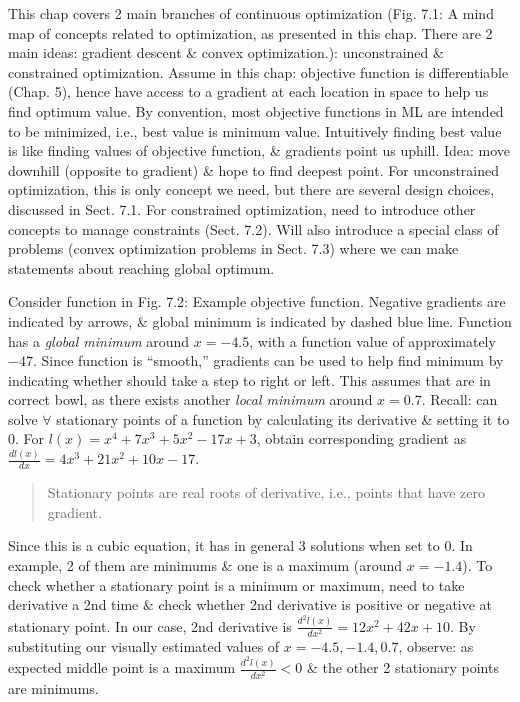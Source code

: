\documentclass{article}
\begin{document}
\begin{enumerate}
\begin{itemize}
\begin{quote}
		\end{quote}
		This chap covers 2 main branches of continuous optimization ({\sf Fig. 7.1: A mind map of concepts related to optimization, as presented in this chap. There are 2 main ideas: gradient descent \& convex optimization.}): unconstrained \& constrained optimization. Assume in this chap: objective function is differentiable (Chap. 5), hence have access to a gradient at each location in space to help us find optimum value. By convention, most objective functions in ML are intended to be minimized, i.e., best value is minimum value. Intuitively finding best value is like finding values of objective function, \& gradients point us uphill. Idea: move downhill (opposite to gradient) \& hope to find deepest point. For unconstrained optimization, this is only concept we need, but there are several design choices, discussed in Sect. 7.1. For constrained optimization, need to introduce other concepts to manage constraints (Sect. 7.2). Will also introduce a special class of problems (convex optimization problems in Sect. 7.3) where we can make statements about reaching global optimum.
		
		Consider function in {\sf Fig. 7.2: Example objective function. Negative gradients are indicated by arrows, \& global minimum is indicated by dashed blue line}. Function has a {\it global minimum} around $x = -4.5$, with a function value of approximately $-47$. Since function is ``smooth,'' gradients can be used to help find minimum by indicating whether should take a step to right or left. This assumes that are in correct bowl, as there exists another {\it local minimum} around $x = 0.7$. Recall: can solve $\forall$ stationary points of a function by calculating its derivative \& setting it to 0. For $l(x) = x^4 + 7x^3 + 5x^2 - 17x + 3$, obtain corresponding gradient as $\frac{dl(x)}{dx} = 4x^3 + 21x^2 + 10x - 17$.
		\begin{quote}
			Stationary points are real roots of derivative, i.e., points that have zero gradient.
		\end{quote}
		Since this is a cubic equation, it has in general 3 solutions when set to 0. In example, 2 of them are minimums \& one is a maximum (around $x = -1.4$). To check whether a stationary point is a minimum or maximum, need to take derivative a 2nd time \& check whether 2nd derivative is positive or negative at stationary point. In our case, 2nd derivative is $\frac{d^2l(x)}{dx^2} = 12x^2 + 42x + 10$. By substituting our visually estimated values of $x = -4.5,-1.4,0.7$, observe: as expected middle point is a maximum $\frac{d^2l(x)}{dx^2} < 0$ \& the other 2 stationary points are minimums.
		

\end{itemize}
\end{enumerate}
\end{document}
